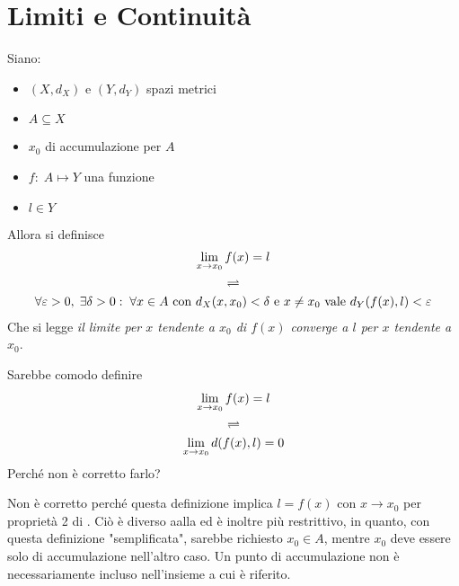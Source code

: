 \section{Limiti e Continuità}
\begin{definition}
	\label{def:lim_funz}
	Siano:
	\begin{itemize}
		\item $(X,d_X)$ e $(Y,d_Y)$ spazi metrici
		\item $A \subseteq X$
		\item $x_0$ di accumulazione per $A$
		\item $f:\; A \mapsto Y$ una funzione
		\item $l \in Y$
	\end{itemize}
	Allora si definisce
	\begin{equation*}
		\begin{gathered}
			\lim\limits_{x \to x_0} f(x) = l\\
			\rightleftharpoons\\
			\forall \varepsilon > 0,\; \exists \delta > 0:\; \forall x \in A \text{ con } d_X(x,x_0) < \delta \text{ e } x \neq x_0 \text{ vale } d_Y(f(x),l)<\varepsilon
		\end{gathered}
	\end{equation*}
	Che si legge \textit{il limite per $x$ tendente a $x_0$ di $f(x)$ converge a $l$ per $x$ tendente a $x_0$}.
\end{definition}
\begin{exercise}
	Sarebbe comodo definire
	\begin{equation*}
		\begin{gathered}
			\lim\limits_{x \to x_0} f(x) = l\\
			\rightleftharpoons\\
			\lim\limits_{x \to x_0} d(f(x), l) = 0
		\end{gathered}
	\end{equation*}
	Perché non è corretto farlo?
	\begin{solution}
		Non è corretto perché questa definizione implica $l = f(x)$ con $x \to x_0$ per proprietà 2 di . Ciò è diverso aalla  ed è inoltre più restrittivo, in quanto, con questa definizione "semplificata", sarebbe richiesto $x_0 \in A$, mentre $x_0$ deve essere solo di accumulazione nell'altro caso. Un punto di accumulazione non è necessariamente incluso nell'insieme a cui è riferito.
	\end{solution}
\end{exercise}

